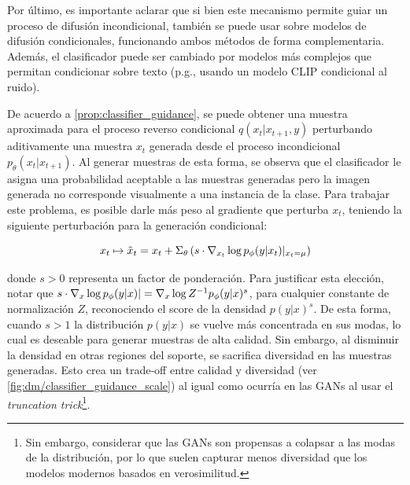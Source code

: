 Por último, es importante aclarar que si bien este mecanismo permite guiar un proceso de difusión incondicional, también se puede usar sobre modelos de difusión condicionales, funcionando ambos métodos de forma complementaria. Además, el clasificador puede ser cambiado por modelos más complejos que permitan condicionar sobre texto (p.g., usando un modelo CLIP condicional al ruido).

De acuerdo a \autoref{prop:classifier_guidance}, se puede obtener una muestra aproximada para el proceso reverso condicional $q(x_t|x_{t+1},y)$ perturbando aditivamente una muestra $x_t$ generada desde el proceso incondicional $p_\theta(x_t|x_{t+1})$. Al generar muestras de esta forma, se observa que el clasificador le asigna una probabilidad aceptable a las muestras generadas pero la imagen generada no corresponde visualmente a una instancia de la clase. Para trabajar este problema, es posible darle más peso al gradiente que perturba $x_t$, teniendo la siguiente perturbación para la generación condicional:

\begin{equation}
    x_t\mapsto \tilde x_t = x_t + \Sigma_\theta \left(s\cdot \nabla_{x_t} \log p_\phi(y|x_t)|_{x_t=\mu}\right)
\end{equation}

donde $s>0$ representa un factor de ponderación. Para justificar esta elección, notar que $s\cdot \nabla_{x} \log p_\phi(y|x)| = \nabla_{x} \log Z^{-1}p_\phi(y|x)^s$, para cualquier constante de normalización $Z$, reconociendo el score de la densidad $p(y|x)^s$. De esta forma, cuando $s>1$ la distribución $p(y|x)$ se vuelve más concentrada en sus modas, lo cual es deseable para generar muestras de alta calidad. Sin embargo, al disminuir la densidad en otras regiones del soporte, se sacrifica diversidad en las muestras generadas. Esto crea un trade-off entre calidad y diversidad (ver \autoref{fig:dm/classifier_guidance_scale}) al igual como ocurría en las GANs al usar el \textit{truncation trick}\footnote{Sin embargo, considerar que las GANs son propensas a colapsar a las modas de la distribución, por lo que suelen capturar menos diversidad que los modelos modernos basados en verosimilitud.}.


